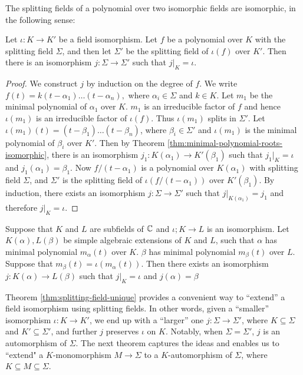 The splitting fields of a polynomial over two isomorphic fields are isomorphic, in the following sense:

\begin{theorem} \label{thm:splitting-field-unique}
	Let $\iota: K \to K'$ be a field isomorphism. Let $f$ be a polynomial over $K$ with the splitting field $\Sigma$, and then let $\Sigma'$ be the splitting field of $\iota(f)$ over $K'$. Then there is an isomorphism $j : \Sigma \to \Sigma'$ such that $j | _K = \iota$. 
\end{theorem}

\begin{proof}
	We construct $j$ by induction on the degree of $f$. We write $ f(t) = k (t - \alpha_1) \ldots (t - \alpha_n), $ where $\alpha_i \in \Sigma$ and $k \in K$. Let $m_1$ be the minimal polynomial of $\alpha_1$ over $K$. $m_1$ is an irreducible factor of $f$ and hence $\iota(m_1)$ is an irreducible factor of $\iota(f)$. Thus $\iota(m_1)$ splits in $\Sigma'$. Let $\iota(m_1)(t) = (t - \beta_1) \ldots (t - \beta_n)$, where $\beta_i \in \Sigma'$ and $\iota(m_1)$ is the minimal polynomial of $\beta_i$ over $K'$. Then by Theorem \ref{thm:minimal-polynomial-roots-isomorphic}, there is an isomorphism $j_1 : K(\alpha_1) \to K'(\beta_1)$ such that $j_1 | _K = \iota$ and $j_1(\alpha_1) = \beta_1$. Now $f / (t - \alpha_1)$ is a polynomial over $K(\alpha_1)$ with splitting field $\Sigma$, and $\Sigma'$ is the splitting field of $\iota(f / (t - \alpha_1))$ over $K'(\beta_1)$. By induction, there exists an isomorphism $j: \Sigma \to \Sigma'$ such that $j | _{K(\alpha_1)} = j_1$ and therefore $j | _K = \iota$. 
\end{proof}

\begin{theorem}
    Suppose that $K$ and $L$ are subfields of $\mathbb C$ and $\iota ; K \to L$ is an isomorphism. Let $K(\alpha),L(\beta)$ be simple algebraic extensions of $K$ and $L$, such that $\alpha$ has minimal polynomial $m_{\alpha}(t)$ over $K$. $\beta$ has minimal polynomial $m_{\beta}(t)$ over $L$. Suppose that $m_{\beta}(t) = \iota(m_{\alpha}(t))$. Then there exists an isomorphism $j : K(\alpha) \to L(\beta)$ such that $j|_{K} = \iota$ and $j(\alpha) = \beta$
\end{theorem}

Theorem \ref{thm:splitting-field-unique} provides a convenient way to ``extend'' a field isomorphism using splitting fields. In other words, given a ``smaller'' isomorphism $\iota: K \to K'$, we end up with a ``larger'' one $j: \Sigma \to \Sigma'$, where $K \subseteq \Sigma$ and $K' \subseteq \Sigma'$, and further $j$ preserves $\iota$ on $K$. Notably, when $\Sigma  = \Sigma'$, $j$ is an automorphism of $\Sigma$. The next theorem captures the ideas and enables us to ``extend" a $K$-monomorphism $M \to \Sigma$ to a $K$-automorphism of $\Sigma$, where $K \subseteq M \subseteq \Sigma$. 

